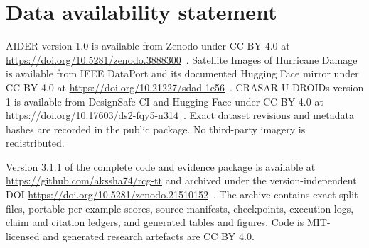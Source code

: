 \documentclass[]{interact}
\begin{document}
\section*{Data availability statement}
AIDER version 1.0 is available from Zenodo under CC BY 4.0 at
\url{https://doi.org/10.5281/zenodo.3888300}~\citep{aiderdata}. Satellite
Images of Hurricane Damage is available from IEEE DataPort and its documented
Hugging Face mirror under CC BY 4.0 at
\url{https://doi.org/10.21227/sdad-1e56}~\citep{hurricanedata}.
CRASAR-U-DROIDs version 1 is available from DesignSafe-CI and Hugging Face
under CC BY 4.0 at
\url{https://doi.org/10.17603/ds2-fqy5-n314}~\citep{crasar2024data}. Exact
dataset revisions and metadata hashes are recorded in the public package. No
third-party imagery is redistributed.

Version 3.1.1 of the complete code and evidence package is available at
\url{https://github.com/akssha74/rcg-tt} and archived under the
version-independent DOI
\url{https://doi.org/10.5281/zenodo.21510152}~\citep{auditsoftware}. The archive
contains exact split files, portable per-example scores, source manifests,
checkpoints, execution logs, claim and citation ledgers, and generated tables
and figures. Code is MIT-licensed and generated research artefacts are CC BY
4.0.

\appendix




\end{document}
